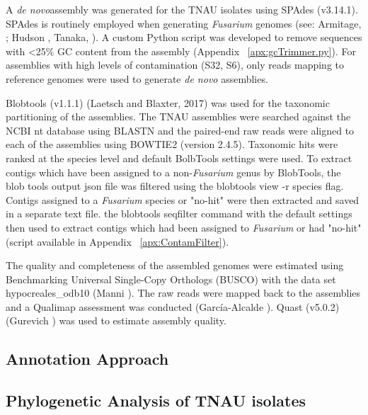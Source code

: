 A  \textit{de novo}assembly was generated for the TNAU isolates using SPAdes (v3.14.1). SPAdes is routinely employed when generating \textit{Fusarium} genomes (see: Armitage, ; Hudson , Tanaka, ). A custom Python script was developed to remove sequences with <25\% GC content from the assembly (Appendix ~\ref{apx:gcTrimmer.py}). For assemblies with high levels of contamination (S32, S6), only reads mapping to reference genomes were used to generate \textit{de novo} assemblies.

Blobtools (v1.1.1) (Laetsch and Blaxter, 2017) was used for the taxonomic partitioning of the assemblies. The TNAU assemblies were searched against the NCBI nt database using BLASTN and the paired-end raw reads were aligned to each of the assemblies using BOWTIE2 (version 2.4.5). Taxonomic hits were ranked at the species level and default BolbTools settings were used. To extract contigs which have been assigned to a non-\textit{Fusarium} genus by BlobTools, the blob tools output json file was filtered using the blobtools view -r species flag. Contigs assigned to a \textit{Fusarium} species or "no-hit" were then extracted and saved in a separate text file. the blobtools seqfilter command with the default settings then used to extract contigs which had been assigned to \textit{Fusarium} or had "no-hit" (script available in Appendix ~\ref{apx:ContamFilter}).

The quality and completeness of the assembled genomes were estimated using Benchmarking Universal Single-Copy Orthologs (BUSCO) with the data set hypocreales\_odb10 (Manni ). The raw reads were mapped back to the assemblies and a Qualimap assessment was conducted (García-Alcalde ). Quast (v5.0.2) (Gurevich ) was used to estimate assembly quality. 


\subsection{Annotation Approach}

\subsection{Phylogenetic Analysis of TNAU isolates}\label{chap2:phylogeny}

